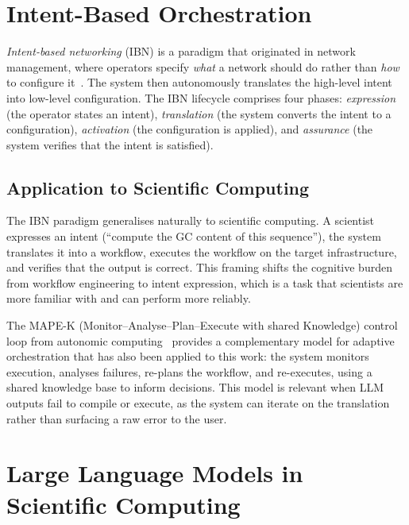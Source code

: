 \section{Intent-Based Orchestration}\label{s:intent-based-orchestration}

\emph{Intent-based networking} (IBN) is a paradigm that originated in network
management, where operators specify \emph{what} a network should do rather than
\emph{how} to configure it~\cite{bn2016ibn}. The system then autonomously
translates the high-level intent into low-level configuration. The IBN lifecycle
comprises four phases: \emph{expression} (the operator states an intent),
\emph{translation} (the system converts the intent to a configuration),
\emph{activation} (the configuration is applied), and \emph{assurance} (the
system verifies that the intent is satisfied).

\subsection{Application to Scientific Computing}

The IBN paradigm generalises naturally to scientific computing. A scientist
expresses an intent (``compute the GC content of this sequence''), the system
translates it into a workflow, executes the workflow on the target
infrastructure, and verifies that the output is correct. This framing shifts the
cognitive burden from workflow engineering to intent expression, which is a
task that scientists are more familiar with and can perform more reliably.

The MAPE-K (Monitor--Analyse--Plan--Execute with shared Knowledge) control loop
from autonomic computing~\cite{kephart2003vision} provides a complementary
model for adaptive orchestration that has also been applied to this work: the system monitors
execution, analyses failures, re-plans the workflow, and re-executes, using a
shared knowledge base to inform decisions. This model is relevant when LLM
outputs fail to compile or execute, as the system can iterate on the translation
rather than surfacing a raw error to the user.

\section{Large Language Models in Scientific Computing}

